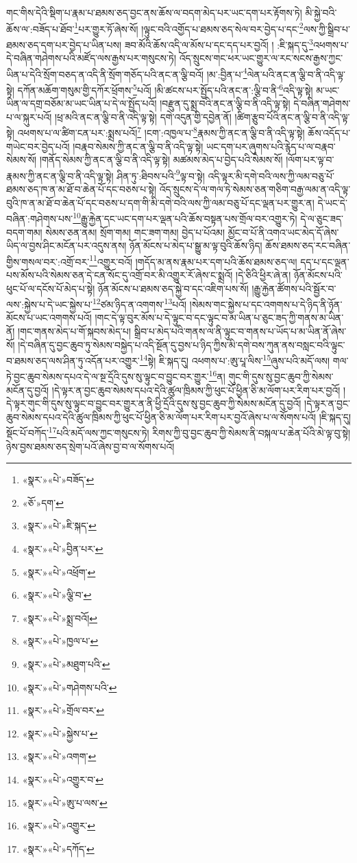 གང་གིས་དེའི་སྡིག་པ་རྣམ་པ་ཐམས་ཅད་བྱང་ནས་ཆོས་ལ་བདག་མེད་པར་ཡང་དག་པར་རྟོགས་ཏེ། མི་སྐྱེ་བའི་ཆོས་ལ་:བཟོད་པ་ཐོབ་\footnote{«སྣར་»«པེ་»བཟོད་}པར་གྱུར་ཏོ་ཞེས་སོ། །ལྟུང་བའི་འགྱོད་པ་ཐམས་ཅད་སེལ་བར་བྱེད་པ་དང་\footnote{«ཅོ་»དག་}ལས་ཀྱི་སྒྲིབ་པ་ཐམས་ཅད་དག་པར་བྱེད་པ་ཡིན་པས། ཟབ་མོའི་ཆོས་འདི་ལ་མོས་པ་དང་དད་པར་བྱའོ། །
:ཇི་སྐད་དུ་\footnote{«སྣར་»«པེ་»ཇི་སྐད་}འཕགས་པ་དེ་བཞིན་གཤེགས་པའི་མཛོད་ལས་རྒྱས་པར་གསུངས་ཏེ། འོད་སྲུངས་གང་ཕར་ཡང་གྱུར་ལ་རང་སངས་རྒྱས་ཀྱང་ཡིན་པ་དེའི་སྲོག་བཅད་ན་འདི་ནི་སྲོག་གཅོད་པའི་ནང་ན་ལྕི་བའོ། །མ་:བྱིན་པ་\footnote{«སྣར་»«པེ་»བྱིན་པར་}ལེན་པའི་ནང་ན་ལྕི་བ་ནི་འདི་ལྟ་སྟེ། དཀོན་མཆོག་གསུམ་གྱི་དཀོར་ཕྲོགས་\footnote{«སྣར་»«པེ་»འཕྲོག་}པའོ། །མི་ཚངས་པར་སྤྱོད་པའི་ནང་ན་:ལྕི་བ་ནི་\footnote{«སྣར་»«པེ་»ལྕི་བ་}འདི་ལྟ་སྟེ། མ་ཡང་ཡིན་ལ་དགྲ་བཅོམ་མ་ཡང་ཡིན་པ་དེ་ལ་སྤྱོད་པའོ། །བརྫུན་དུ་སྨྲ་བའི་ནང་ན་ལྕི་བ་ནི་འདི་ལྟ་སྟེ། དེ་བཞིན་གཤེགས་པ་ལ་སྐུར་པའོ། །ཕྲ་མའི་ནང་ན་ལྕི་བ་ནི་འདི་ལྟ་སྟེ། དགེ་འདུན་གྱི་དབྱེན་ནོ། །ཚིག་རྩུབ་པོའི་ནང་ན་ལྕི་བ་ནི་འདི་ལྟ་སྟེ། འཕགས་པ་ལ་ཚིག་ངན་པར་:སྨྲས་པའོ།\footnote{«སྣར་»«པེ་»སྨྲ་བའོ།} །ངག་:འཁྱལ་པ་\footnote{«སྣར་»«པེ་»ཁྱལ་པ་}རྣམས་ཀྱི་ནང་ན་ལྕི་བ་ནི་འདི་ལྟ་སྟེ། ཆོས་འདོད་པ་གཡེང་བར་བྱེད་པའོ། །བརྣབ་སེམས་ཀྱི་ནང་ན་ལྕི་བ་ནི་འདི་ལྟ་སྟེ། ཡང་དག་པར་ཞུགས་པའི་རྙེད་པ་ལ་བརྣབ་སེམས་སོ། །གནོད་སེམས་ཀྱི་ནང་ན་ལྕི་བ་ནི་འདི་ལྟ་སྟེ། མཚམས་མེད་པ་བྱེད་པའི་སེམས་སོ། །ལོག་པར་ལྟ་བ་རྣམས་ཀྱི་ནང་ན་ལྕི་བ་ནི་འདི་ལྟ་སྟེ། ཤིན་ཏུ་:ཐིབས་པའི་\footnote{«སྣར་»«པེ་»མཐུག་པའི་}ལྟ་བ་སྟེ། འདི་ལྟར་མི་དགེ་བའི་ལས་ཀྱི་ལམ་བཅུ་པོ་ཐམས་ཅད་ཁ་ན་མ་ཐོ་བ་ཆེན་པོ་དང་བཅས་པ་སྟེ། འོད་སྲུངས་དེ་ལ་གལ་ཏེ་སེམས་ཅན་གཅིག་བརྒྱ་ལམ་ན་འདི་ལྟ་བུའི་ཁ་ན་མ་ཐོ་བ་ཆེན་པོ་དང་བཅས་པ་དག་གི་མི་དགེ་བའི་ལས་ཀྱི་ལམ་བཅུ་པོ་དང་ལྡན་པར་གྱུར་ན། དེ་ཡང་དེ་བཞིན་:གཤེགས་པས་\footnote{«སྣར་»«པེ་»གཤེགས་པའི་}རྒྱུ་རྐྱེན་དང་ཡང་དག་པར་ལྡན་པའི་ཆོས་བསྟན་པས་གྲོལ་བར་འགྱུར་ཏེ། དེ་ལ་ཅུང་ཟད་བདག་གམ། སེམས་ཅན་ནམ། སྲོག་གམ། གང་ཟག་གམ། བྱེད་པ་པོའམ། མྱོང་བ་པོ་ནི་འགའ་ཡང་མེད་དོ་ཞེས་ཡིད་ལ་བྱས་ཤིང་མངོན་པར་འདུས་ནས། ཉོན་མོངས་པ་མེད་པ་སྒྱུ་མ་ལྟ་བུའི་ཆོས་ཉིད། ཆོས་ཐམས་ཅད་རང་བཞིན་གྱིས་གསལ་བར་:འགྲོ་བར་\footnote{«སྣར་»«པེ་»གྲོལ་བར་}འགྱུར་བའོ། །གདོད་མ་ནས་རྣམ་པར་དག་པའི་ཆོས་ཐམས་ཅད་ལ། དད་པ་དང་ལྡན་པས་མོས་པའི་སེམས་ཅན་དེ་ངན་སོང་དུ་འགྲོ་བར་མི་འགྱུར་རོ་ཞེས་ང་སྨྲའོ། །དེ་ཅིའི་ཕྱིར་ཞེ་ན། ཉོན་མོངས་པའི་ཕུང་པོ་ལ་དངོས་པོ་མེད་པ་སྟེ། ཉོན་མོངས་པ་ཐམས་ཅད་སྐྱེ་བ་དང་འཇིག་པས་སོ། །རྒྱུ་རྐྱེན་ཚོགས་པའི་སྦྱོར་བ་ལས་:སྐྱེས་པ་དེ་ཡང་སྐྱེས་པ་\footnote{«སྣར་»«པེ་»སྐྱེས་པ་}ཙམ་ཉིད་ན་འགགས་\footnote{«སྣར་»«པེ་»འགག་}པའོ། །སེམས་གང་སྐྱེས་པ་དང་འགགས་པ་དེ་ཉིད་ནི་ཉོན་མོངས་པ་ཡང་འགགས་པའོ། །གང་དེ་ལྟ་བུར་མོས་པ་དེ་ལྟུང་བ་དང་ལྟུང་བ་མ་ཡིན་པ་ཅུང་ཟད་ཀྱི་གནས་མ་ཡིན་ནོ། །གང་གནས་མེད་པ་གོ་སྐབས་མེད་པ། སྒྲིབ་པ་མེད་པའི་གནས་ལ་ནི་ལྟུང་བ་གནས་པ་ཡོད་པ་མ་ཡིན་ནོ་ཞེས་སོ། །དེ་བཞིན་དུ་བྱང་ཆུབ་ཏུ་སེམས་བསྐྱེད་པ་འདི་སྔོན་དུ་བྱས་པ་ཉིད་ཀྱིས་མི་དགེ་བས་ཀུན་ནས་བསླང་བའི་ལྟུང་བ་ཐམས་ཅད་ལས་ཤིན་ཏུ་འདོན་པར་འགྱུར་\footnote{«སྣར་»«པེ་»འགྱུར་བ་}སྟེ། ཇི་སྐད་དུ། འཕགས་པ་:ཨུ་པཱ་ལིས་\footnote{«སྣར་»«པེ་»ཨུ་པ་ལས་}ཞུས་པའི་མདོ་ལས། གལ་ཏེ་བྱང་ཆུབ་སེམས་དཔའ་དེ་ལ་སྔ་དྲོའི་དུས་སུ་ལྟུང་བ་བྱུང་བར་གྱུར་\footnote{«སྣར་»«པེ་»འགྱུར་}ན། གུང་གི་དུས་སུ་བྱང་ཆུབ་ཀྱི་སེམས་མངོན་དུ་བྱའོ། །དེ་ལྟར་ན་བྱང་ཆུབ་སེམས་དཔའ་དེའི་ཚུལ་ཁྲིམས་ཀྱི་ཕུང་པོ་ཕྱིན་ཅི་མ་ལོག་པར་རིག་པར་བྱའོ། །དེ་ལྟར་གུང་གི་དུས་སུ་ལྟུང་བ་བྱུང་བར་གྱུར་ན་ནི་ཕྱི་དྲོའི་དུས་སུ་བྱང་ཆུབ་ཀྱི་སེམས་མངོན་དུ་བྱའོ། །དེ་ལྟར་ན་བྱང་ཆུབ་སེམས་དཔའ་དེའི་ཚུལ་ཁྲིམས་ཀྱི་ཕུང་པོ་ཕྱིན་ཅི་མ་ལོག་པར་རིག་པར་བྱའོ་ཞེས་པ་ལ་སོགས་པའོ། །ཇི་སྐད་དུ། སྡོང་པོ་བཀོད་\footnote{«སྣར་»«པེ་»དཀོད་}པའི་མདོ་ལས་ཀྱང་གསུངས་ཏེ། རིགས་ཀྱི་བུ་བྱང་ཆུབ་ཀྱི་སེམས་ནི་བསྐལ་པ་ཆེན་པོའི་མེ་ལྟ་བུ་སྟེ། ཉེས་བྱས་ཐམས་ཅད་སྲེག་པའོ་ཞེས་བྱ་བ་ལ་སོགས་པའོ། 